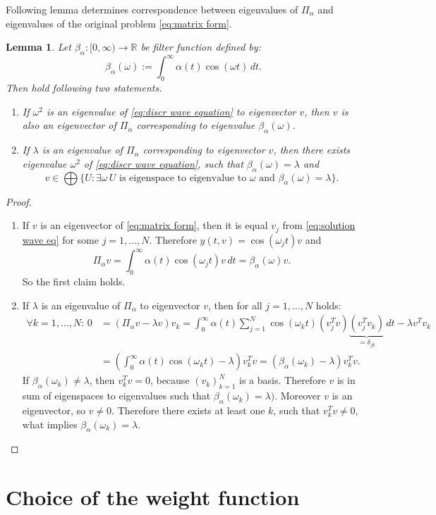 \documentclass[a4paper,11pt,bibliography=totoc,listof=totoc,headinclude=true,cleardoublepage=empty,oneside]{scrbook}
\newtheorem{lemma}[theorem]{Lemma}
\newcommand{\R}{\mathbb{R}}
\begin{document}
Following lemma determines correspondence between eigenvalues of $\Pi_\alpha$ and eigenvalues of the original problem \eqref{eq:matrix form}.
\begin{lemma}
    Let $\beta_\alpha : [0, \infty) \rightarrow \R$ be filter function defined by:
    \begin{equation}
        \beta_\alpha(\omega) := \int_0^\infty \alpha(t) \cos(\omega t) \,dt. 
    \end{equation}
    Then hold following two statements.
    \begin{enumerate}
        \item If $\omega^2$ is an eigenvalue of \eqref{eq:discr wave equation} to eigenvector $v$, then $v$ is also an eigenvector of $\Pi_\alpha$ corresponding to eigenvalue $\beta_\alpha(\omega)$. 
        \item If $\lambda$ is an eigenvalue of $\Pi_\alpha$ corresponding to eigenvector $v$, then there exists eigenvalue $\omega^2$ of \eqref{eq:discr wave equation}, such that $\beta_\alpha (\omega) = \lambda$ and 
        \begin{equation*}
            v \in \bigoplus\{ U : \exists \omega \, U \text{ is eigenspace to eigenvalue to } \omega \text{ and } \beta_\alpha(\omega) = \lambda\}.
        \end{equation*}
    \end{enumerate}
\end{lemma}
\begin{proof}
    \begin{enumerate}
        \item If $v$ is an eigenvector of \eqref{eq:matrix form}, then it is equal $v_j$ from \eqref{eq:solution wave eq} for some $j=1, \dots, N$. Therefore $y(t, v) = \cos(\omega_j t)v$ and 
        \begin{equation*}
            \Pi_\alpha v = \int_0^\infty \alpha(t) \cos(\omega_j t) v \, dt = \beta_\alpha(\omega) v.
        \end{equation*}
        So the first claim holds.
        \item If $\lambda$ is an eigenvalue of $\Pi_\alpha$ to eigenvector $v$, then for all $j=1, \dots, N$ holds:
        \begin{align*}
            \forall k =1, \dots, N:\, 0 &= (\Pi_\alpha v - \lambda v)v_k = \int_0^\infty \alpha(t) \sum_{j=1}^N \cos(\omega_k t) (v_j^T v)\underbrace{(v_j^T v_k)}_{=\delta_{jk}} \, dt - \lambda v^Tv_k \\ &= \left(\int_0^\infty \alpha(t) \cos(\omega_kt) - \lambda \right)v_k^T v = (\beta_\alpha(\omega_k) - \lambda)v_k^T v.
        \end{align*}
        If $\beta_\alpha (\omega_k)\neq \lambda$, then $v_k^Tv = 0$, because $(v_k)_{k=1}^N$ is a basis. Therefore $v$ is in sum of eigenspaces to eigenvalues such that $\beta_\alpha(\omega_k) = \lambda)$. Moreover $v$ is an eigenvector, so $v\neq 0$. Therefore there exists at least one $k$, such that $v_k^T v \neq 0$, what implies $\beta_\alpha (\omega_k) = \lambda$. 
    \end{enumerate}
\end{proof}




\chapter{Choice of the weight function}
\label{chapter:function}
\cite{nannen}\cite{numodes}

 
%

\end{document}
